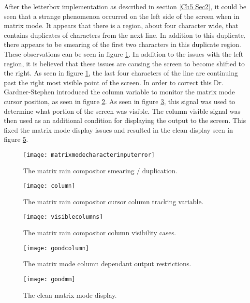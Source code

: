 After the letterbox implementation as described in section \ref{Ch5 Sec2}, it could be seen that a strange phenomenon occurred on the left side of the screen when in matrix mode. It appears that there is a region, about four character wide, that contains duplicates of characters from the next line. In addition to this duplicate, there appears to be smearing of the first two characters in this duplicate region. These observations can be seen in figure \ref{fig:matrixmodecharacterinputerror}. In addition to the issues with the left region, it is believed that these issues are causing the screen to become shifted to the right. As seen in figure \ref{fig:matrixmodecharacterinputerror}, the last four characters of the line are continuing past the right most visible point of the screen. In order to correct this Dr. Gardner-Stephen introduced the column variable to monitor the matrix mode cursor position, as seen in figure \ref{fig:column}. As seen in figure \ref{fig:visiblecolumns}, this signal was used to determine what portion of the screen was visible. The column visible signal was then used as an additional condition for displaying the output to the screen. This fixed the matrix mode display issues and resulted in the clean display seen in figure \ref{fig:goodmm}.

\begin{figure}
  \centering
  \texttt{[image: matrixmodecharacterinputerror]}
  \caption{The matrix rain compositor smearing / duplication.}
  \label{fig:matrixmodecharacterinputerror}
\end{figure}

\begin{figure}
  \centering
  \texttt{[image: column]}
  \caption{The matrix rain compositor cursor column tracking variable.}
  \label{fig:column}
\end{figure}

\begin{figure}
  \centering
  \texttt{[image: visiblecolumns]}
  \caption{The matrix rain compositor column visibility cases.}
  \label{fig:visiblecolumns}
\end{figure}

\begin{figure}
  \centering
  \texttt{[image: goodcolumn]}
  \caption{The matrix mode column dependant output restrictions.}
  \label{fig:goodcolumn}
\end{figure}

\begin{figure}
  \centering
  \texttt{[image: goodmm]}
  \caption{The clean matrix mode display.}
  \label{fig:goodmm}
\end{figure}
